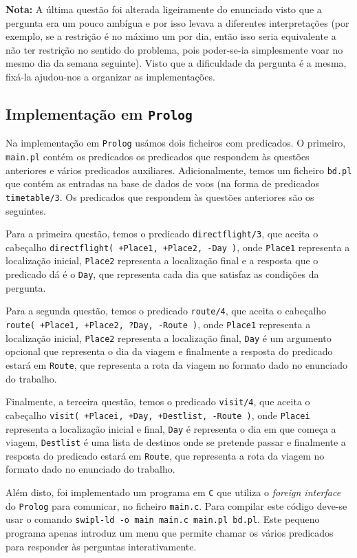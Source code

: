\documentclass[12pt,a4paper,oneside]{article}
\begin{document}
\textbf{Nota:} A última questão foi alterada ligeiramente do enunciado
visto que a pergunta era um pouco ambígua e por isso levava a
diferentes interpretações (por exemplo, se a restrição é no máximo um
por dia, então isso seria equivalente a não ter restrição no sentido
do problema, pois poder-se-ia simplesmente voar no mesmo dia da semana
seguinte). Visto que a dificuldade da pergunta é a mesma, fixá-la
ajudou-nos a organizar as implementações.

\subsection{Implementação em \texttt{Prolog}}

Na implementação em \texttt{Prolog} usámos dois ficheiros com
predicados. O primeiro, \texttt{main.pl} contém os predicados os
predicados que respondem às questões anteriores e vários predicados
auxiliares. Adicionalmente, temos um ficheiro \texttt{bd.pl} que
contém as entradas na base de dados de voos (na forma de predicados
\texttt{timetable/3}. Os predicados que respondem às questões
anteriores são os seguintes.

Para a primeira questão, temos o predicado \texttt{directflight/3}, que
aceita o cabeçalho \texttt{directflight( +Place1, +Place2, -Day )}, onde
\texttt{Place1} representa a localização inicial, \texttt{Place2}
representa a localização final e a resposta que o predicado dá é o
\texttt{Day}, que representa cada dia que satisfaz as condições da
pergunta.

Para a segunda questão, temos o predicado \texttt{route/4}, que aceita
o cabeçalho \texttt{route( +Place1, +Place2, ?Day, -Route )}, onde
\texttt{Place1} representa a localização inicial, \texttt{Place2}
representa a localização final, \texttt{Day} é um argumento opcional
que representa o dia da viagem e finalmente a resposta do predicado
estará em \texttt{Route}, que representa a rota da viagem no formato
dado no enunciado do trabalho.

Finalmente, a terceira questão, temos o predicado \texttt{visit/4},
que aceita o cabeçalho \texttt{visit( +Placei, +Day, +Destlist, -Route
  )}, onde \texttt{Placei} representa a localização inicial e final,
\texttt{Day} é representa o dia em que começa a viagem,
\texttt{Destlist} é uma lista de destinos onde se pretende passar e
finalmente a resposta do predicado estará em \texttt{Route}, que
representa a rota da viagem no formato dado no enunciado do trabalho.

Além disto, foi implementado um programa em \texttt{C} que utiliza o
\textit{foreign interface} do \texttt{Prolog} para comunicar, no
ficheiro \texttt{main.c}. Para compilar este código deve-se usar o
comando \texttt{swipl-ld -o main main.c main.pl bd.pl}. Este pequeno
programa apenas introduz um menu que permite chamar os vários
predicados para responder às perguntas interativamente.
\end{document}

